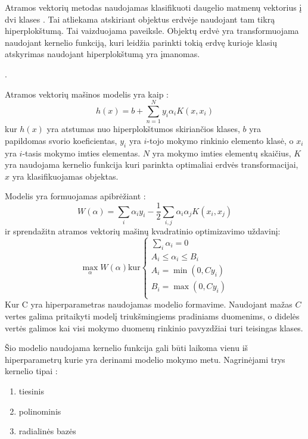 Atramos vektorių metodas naudojamas klasifikuoti daugelio matmenų vektorius į dvi klases \cite{comp}. Tai atliekama atskiriant objektus erdvėje naudojant tam tikrą hiperplokštumą. Tai vaizduojama  paveiksle. Objektų erdvė yra transformuojama naudojant kernelio funkciją, kuri leidžia parinkti tokią erdvę kurioje klasių atskyrimas naudojant hiperplokštumą yra įmanomas.

.

Atramos vektorių mašinos modelis yra kaip \cite{comp}:
\begin{equation}
    h(x) = b + \sum_{n=1}^{N}y_i \alpha_i K(x, x_i)
\end{equation}
kur $h(x)$ yra atstumas nuo hiperplokštumos skiriančios klases, $b$ yra papildomas svorio koeficientas, $y_i$ yra $i$-tojo mokymo rinkinio elemento klasė, o $x_i$ yra $i$-tasis mokymo imties elementas. $N$ yra mokymo imties elementų skaičius, $K$ yra naudojama kernelio funkcija kuri parinkta optimaliai erdvės transformacijai, $x$ yra klasifikuojamas objektas.

Modelis yra formuojamas apibrėžiant \cite{ksvm}:
\begin{equation}
    W(\alpha) = \sum_{i}\alpha_i y_i - \frac{1}{2} \sum_{i, j} \alpha_i \alpha_j K(x_i, x_j)
\end{equation}
ir sprendažitn atramos vektorių mašinų kvadratinio optimizavimo uždavinį:
\begin{equation}
\max_{\alpha} W(\alpha) \text{kur} \left\{
                  \begin{array}{l}
                    \sum_{i} \alpha_i = 0 \\
                    A_i \leq \alpha_i \leq B_i \\
                    A_i = \min(0, Cy_i) \\
                    B_i = \max(0, Cy_i) \\
                  \end{array}
                \right.
\end{equation}
Kur C yra hiperparametras naudojamas modelio formavime. Naudojant mažas $C$ vertes galima pritaikyti modelį triukšmingiems pradiniams duomenims, o didelės vertės galimos kai visi mokymo duomenų rinkinio pavyzdžiai turi teisingas klases.

Šio modelio naudojama kernelio funkcija gali būti laikoma vienu iš hiperparametrų kurie yra derinami modelio mokymo metu. Nagrinėjami trys kernelio tipai \cite{vw}:
\begin{enumerate}
    \item tiesinis
    \item polinominis
    \item radialinės bazės
\end{enumerate}

